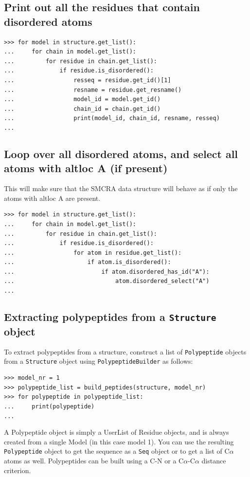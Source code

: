 \subsection*{Print out all the residues that contain disordered atoms}

\begin{verbatim}
>>> for model in structure.get_list():
...     for chain in model.get_list():
...         for residue in chain.get_list():
...             if residue.is_disordered():
...                 resseq = residue.get_id()[1]
...                 resname = residue.get_resname()
...                 model_id = model.get_id()
...                 chain_id = chain.get_id()
...                 print(model_id, chain_id, resname, resseq)
...
\end{verbatim}

\subsection*{Loop over all disordered atoms, and select all atoms with altloc A (if present)}
This will make sure that the SMCRA data structure will behave as if only the
atoms with altloc A are present.

\begin{verbatim}
>>> for model in structure.get_list():
...     for chain in model.get_list():
...         for residue in chain.get_list():
...             if residue.is_disordered():
...                 for atom in residue.get_list():
...                     if atom.is_disordered():
...                         if atom.disordered_has_id("A"):
...                             atom.disordered_select("A")
...
\end{verbatim}

\subsection*{Extracting polypeptides from a \texttt{Structure} object}

To extract polypeptides from a structure, construct a list of \texttt{Polypeptide} objects from a \texttt{Structure} object using \texttt{PolypeptideBuilder} as follows:

\begin{verbatim}
>>> model_nr = 1
>>> polypeptide_list = build_peptides(structure, model_nr)
>>> for polypeptide in polypeptide_list:
...     print(polypeptide)
...
\end{verbatim}

A Polypeptide object is simply a UserList of Residue objects, and is always created from a single Model (in this case model 1).
You can use the resulting \texttt{Polypeptide} object to get the sequence as a \texttt{Seq} object or to get a list of C$\alpha$ atoms as well. Polypeptides can be built using a C-N or a C$\alpha$-C$\alpha$ distance criterion.

